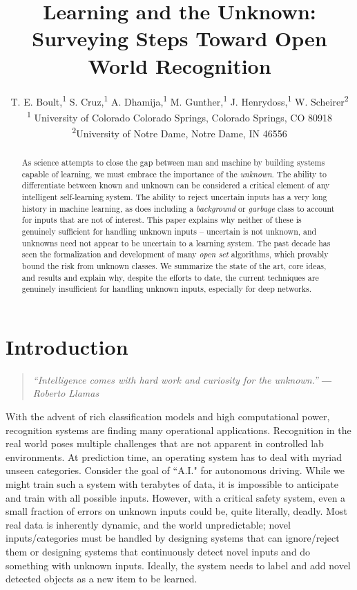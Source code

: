 \documentclass[letterpaper]{article}
\title{ 
Learning and the Unknown: Surveying Steps Toward Open World Recognition
}
\author{
T. E. Boult,\textsuperscript{\rm 1}
S. Cruz,\textsuperscript{\rm 1}
A. Dhamija,\textsuperscript{\rm 1}
M. Gunther,\textsuperscript{\rm 1}
J. Henrydoss,\textsuperscript{\rm 1}
W. Scheirer\textsuperscript{\rm 2}\\
\textsuperscript{\rm 1} University of Colorado Colorado Springs, Colorado Springs, CO 80918\\
\textsuperscript{\rm 2}University of Notre Dame, Notre Dame, IN 46556\\
}
\begin{document}
\maketitle
\begin{abstract}


As science attempts to close the gap between man and machine by building systems capable of learning, we must embrace the importance of the {\em unknown}.
The ability to differentiate between known and unknown can be considered a critical element of any intelligent self-learning system.
The ability to reject uncertain inputs has a very long history in machine learning, as does including a {\em background} or {\em garbage} class to account for inputs that are not of interest.
This paper explains why neither of these is genuinely sufficient for handling unknown inputs -- uncertain is not unknown, and unknowns need not appear to be uncertain to a learning system.
The past decade has seen the formalization and development of many {\em open set} algorithms, which provably bound the risk from unknown classes.
We summarize the state of the art, core ideas, and results and explain why, despite the efforts to date, the current techniques are genuinely insufficient for handling unknown inputs, especially for deep networks.

\end{abstract}


\section{Introduction}

\begin{quote}\em
``Intelligence comes with hard work and curiosity for the unknown.”  ― Roberto Llamas
\end{quote}





With the advent of rich classification models and high computational power, recognition systems are finding many operational applications.
Recognition in the real world poses multiple challenges that are not apparent in controlled lab environments. At prediction time, an operating system has to deal with myriad unseen categories.  Consider the goal of ``A.I." for autonomous driving.  While we might train such a system with terabytes of data, it is impossible to anticipate and train with all possible inputs.  However, with a critical safety system, even a small fraction of errors on unknown inputs could be, quite literally, deadly.
Most real data is inherently dynamic, and the world unpredictable;  novel inputs/categories must be handled by designing systems that can ignore/reject them or designing systems that continuously detect novel inputs and do something with unknown inputs. Ideally, the system needs to label and add novel detected objects as a new item to be learned. 
\end{document}
